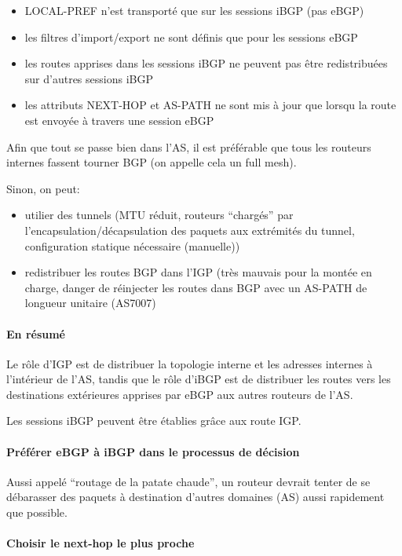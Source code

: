 \documentclass{report}
\begin{document}
\begin{itemize}
\item LOCAL-PREF n'est transporté que sur les sessions iBGP (pas eBGP)
\item les filtres d'import/export ne sont définis que pour les
  sessions eBGP
\item les routes apprises dans les sessions iBGP ne peuvent pas être
  redistribuées sur d'autres sessions iBGP
\item les attributs NEXT-HOP et AS-PATH ne sont mis à jour que lorsqu
  la route est envoyée à travers une session eBGP
\end{itemize}

Afin que tout se passe bien dans l'AS, il est préférable que tous les
routeurs internes fassent tourner BGP (on appelle cela un full mesh).

Sinon, on peut:

\begin{itemize}
\item utilier des tunnels (MTU réduit, routeurs ``chargés'' par
  l'encapsulation/décapsulation des paquets aux extrémités du tunnel,
  configuration statique nécessaire (manuelle))
\item redistribuer les routes BGP dans l'IGP (très mauvais pour la
  montée en charge, danger de réinjecter les routes dans BGP avec un
  AS-PATH de longueur unitaire (AS7007)
\end{itemize}

\paragraph{En résumé}

Le rôle d'IGP est de distribuer la topologie interne et les adresses
internes à l'intérieur de l'AS, tandis que le rôle d'iBGP est de
distribuer les routes vers les destinations extérieures apprises par
eBGP aux autres routeurs de l'AS.

Les sessions iBGP peuvent être établies grâce aux route IGP.

\paragraph{Préférer eBGP à iBGP dans le processus de décision}

Aussi appelé ``routage de la patate chaude'', un routeur devrait
tenter de se débarasser des paquets à destination d'autres domaines
(AS) aussi rapidement que possible.

\paragraph{Choisir le next-hop le plus proche}
\end{document}
